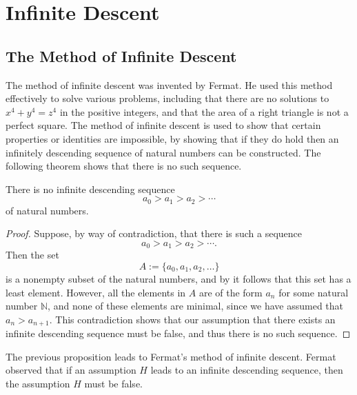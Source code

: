 \chapter{Infinite Descent}

\section{The Method of Infinite Descent}

The method of infinite descent was invented by Fermat. He used this method effectively to solve various problems, including that there are no solutions to $x^4+y^4=z^4$ in the positive integers, and that the area of a right triangle is not a perfect square. The method of infinite descent is used to show that certain properties or identities are impossible, by showing that if they do hold then an infinitely descending sequence of natural numbers can be constructed. The following theorem shows that there is no such sequence.

\begin{proposition}\label{proposition:infinite-descent}
  There is no infinite descending sequence
  \begin{equation*}
    a_0 > a_1 > a_2 > \cdots
  \end{equation*}
  of natural numbers.
\end{proposition}

\begin{proof}
  Suppose, by way of contradiction, that there is such a sequence
  \begin{equation*}
    a_0 > a_1 > a_2 > \cdots.
  \end{equation*}
  Then the set
  \begin{equation*}
    A:=\{a_0,a_1,a_2,\ldots\}
  \end{equation*}
  is a nonempty subset of the natural numbers, and by  it follows that this set has a least element. However, all the elements in $A$ are of the form $a_n$ for some natural number $\mathbb{N}$, and none of these elements are minimal, since we have assumed that $a_n>a_{n+1}$. This contradiction shows that our assumption that there exists an infinite descending sequence must be false, and thus there is no such sequence.
\end{proof}

The previous proposition leads to Fermat's method of infinite descent. Fermat observed that if an assumption $H$ leads to an infinite descending sequence, then the assumption $H$ must be false. 


